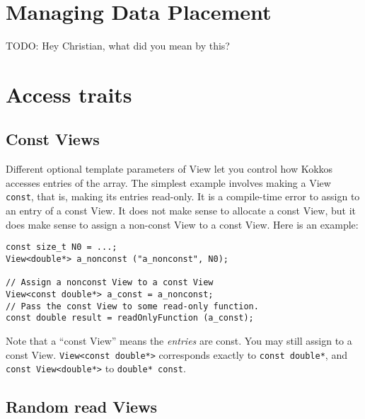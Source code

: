 \section{Managing Data Placement}\label{S:Views:Placement}

TODO: Hey Christian, what did you mean by this?

\section{Access traits}\label{S:Views:AccessTraits}

\subsection{Const Views}

Different optional template parameters of View let you control how
Kokkos accesses entries of the array.  The simplest example involves
making a View \lstinline!const!, that is, making its entries read-only.  It
is a compile-time error to assign to an entry of a const View.  It
does not make sense to allocate a const View, but it does make sense
to assign a non-const View to a const View.  Here is an example:
\begin{lstlisting}
const size_t N0 = ...;
View<double*> a_nonconst ("a_nonconst", N0);

// Assign a nonconst View to a const View
View<const double*> a_const = a_nonconst;
// Pass the const View to some read-only function.
const double result = readOnlyFunction (a_const);
\end{lstlisting}
Note that a ``const View'' means the \emph{entries} are const.  You
may still assign to a const View.  \lstinline!View<const double*>!
corresponds exactly to \lstinline!const double*!, and
\lstinline!const View<double*>! to \lstinline!double* const!.

\subsection{Random read Views}


